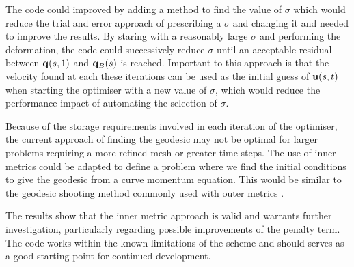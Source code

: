 \documentclass[a4paper, 12pt]{article}
\begin{document}
The code could improved by adding a method to find the value of
$\sigma$ which would reduce the trial and error approach of prescribing a
$\sigma$ and changing it and needed to improve the results. By staring with a
reasonably large $\sigma$ and performing the deformation, the code could
successively reduce $\sigma$ until an acceptable residual between $\mathbf{q}(s,1)$ and
$\mathbf{q}_B(s)$ is reached. Important to this approach is that the velocity found at each these iterations can be used as
the initial guess of $\mathbf{u}(s,t)$  when starting the
optimiser with a new value of $\sigma$, which would reduce the performance
impact of automating the selection of $\sigma$.

Because of the storage requirements involved in each iteration of the optimiser,
the current approach of finding the geodesic may not be optimal for larger
problems requiring a more refined mesh or greater time steps. The use of inner
metrics could be adapted to define a problem where we find the initial
conditions to give the geodesic from a curve momentum equation. This would be
similar to the geodesic shooting method commonly used with outer metrics
\cite{miller2006geodesic, cotter2009geodesic, clark2011reparam}.


The results show that the inner metric approach is valid and warrants further
investigation, particularly regarding possible improvements of the penalty
term. The code works within the known limitations of the scheme and should serves as
a good starting point for continued development.


\newpage
{}

{}
\end{document}
